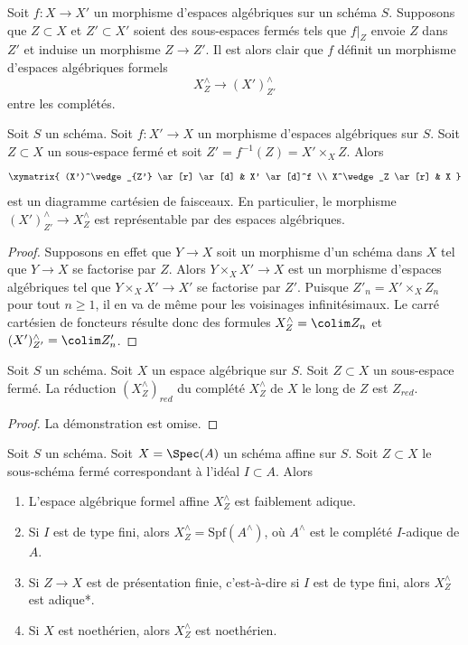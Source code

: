 \medskip\noindent
Soit $f : X \to X'$ un morphisme d'espaces algébriques sur un schéma $S$.
Supposons que $Z \subset X$ et $Z' \subset X'$ soient des sous-espaces fermés
tels que $f|_Z$ envoie $Z$ dans $Z'$ et induise un morphisme $Z \to Z'$.
Il est alors clair que $f$ définit un morphisme d'espaces algébriques formels
$$
X^\wedge_Z \longrightarrow (X')^\wedge_{Z'}
$$
entre les complétés.

\begin{lemma}
\label{lemma-map-completions-subspaces-representable}
Soit $S$ un schéma. Soit $f : X' \to X$ un morphisme
d'espaces algébriques sur $S$. Soit $Z \subset X$
un sous-espace fermé et soit $Z' = f^{-1}(Z) = X' \times_X Z$.
Alors
$$
\xymatrix{
(X')^\wedge_{Z'} \ar[r] \ar[d] & X' \ar[d]^f \\
X^\wedge_Z \ar[r] & X
}
$$
est un diagramme cartésien de faisceaux. En particulier, le morphisme
$(X')^\wedge_{Z'} \to X^\wedge_Z$ est représentable par des espaces algébriques.
\end{lemma}

\begin{proof}
Supposons en effet que $Y \to X$ soit un morphisme d'un schéma dans $X$ tel
que $Y \to X$ se factorise par $Z$. Alors $Y \times_X X' \to X$
est un morphisme d'espaces algébriques tel que $Y \times_X X' \to X'$
se factorise par $Z'$. Puisque $Z'_n = X' \times_X Z_n$ pour tout $n \geq 1$,
il en va de même pour les voisinages infinitésimaux.
Le carré cartésien de foncteurs résulte donc
des formules $X^\wedge_Z = \colim Z_n$ et
$(X')^\wedge_{Z'} = \colim Z'_n$.
\end{proof}

\begin{lemma}
\label{lemma-reduction-completion-subspace}
Soit $S$ un schéma. Soit $X$ un espace algébrique sur $S$.
Soit $Z \subset X$ un sous-espace fermé. La réduction $(X^\wedge_Z)_{red}$
du complété $X^\wedge_Z$ de $X$ le long de $Z$ est $Z_{red}$.
\end{lemma}

\begin{proof}
La démonstration est omise.
\end{proof}

\begin{lemma}
\label{lemma-affine-formal-completion-subspace-types}
Soit $S$ un schéma. Soit $X = \Spec(A)$ un schéma affine sur $S$.
Soit $Z \subset X$ le sous-schéma fermé correspondant à l'idéal
$I \subset A$. Alors
\begin{enumerate}
\item L'espace algébrique formel affine $X^\wedge_Z$ est faiblement adique.
\item Si $I$ est de type fini, alors
$X^\wedge_Z = \text{Spf}(A^\wedge)$, où $A^\wedge$ est le
complété $I$-adique de $A$.
\item Si $Z \to X$ est de présentation finie, c'est-à-dire si $I$ est
de type fini, alors $X^\wedge_Z$ est adique*.
\item Si $X$ est noethérien, alors $X^\wedge_Z$ est noethérien.
\end{enumerate}
\end{lemma}

